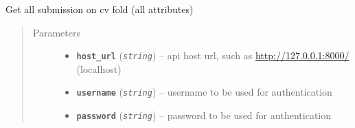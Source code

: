 \documentclass[letterpaper,10pt,english]{sphinxmanual}
\begin{document}

\begin{fulllineitems}
\label{modules/views:test_files.post_api.get_submission_fold}
Get all submission on cv fold (all attributes)
\begin{quote}\begin{description}
\item[{Parameters}] \leavevmode\begin{itemize}
\item {} 
\textbf{\texttt{host\_url}} (\emph{\texttt{string}}) -- api host url, such as \url{http://127.0.0.1:8000/} (localhost)

\item {} 
\textbf{\texttt{username}} (\emph{\texttt{string}}) -- username to be used for authentication

\item {} 
\textbf{\texttt{password}} (\emph{\texttt{string}}) -- password to be used for authentication

\end{itemize}

\end{description}\end{quote}

\end{fulllineitems}

\end{document}
